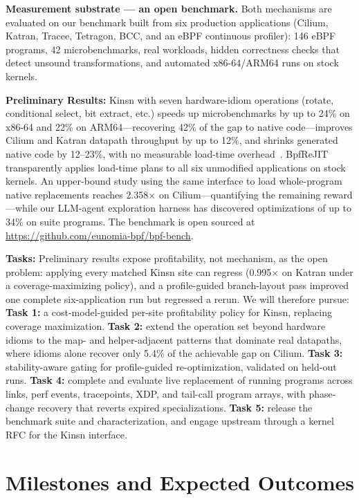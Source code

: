 \noindent\textbf{Measurement substrate --- an open benchmark.}  Both mechanisms are evaluated on our benchmark built from six production applications (Cilium, Katran, Tracee, Tetragon, BCC, and an eBPF continuous profiler): 146 eBPF programs, 42 microbenchmarks, real workloads, hidden correctness checks that detect unsound transformations, and automated x86-64/ARM64 runs on stock kernels.

\noindent\textbf{Preliminary Results:} Kinsn with seven hardware-idiom operations (rotate, conditional select, bit extract, etc.) speeds up microbenchmarks by up to 24\% on x86-64 and 22\% on ARM64---recovering 42\% of the gap to native code---improves Cilium and Katran datapath throughput by up to 12\%, and shrinks generated native code by 12--23\%, with no measurable load-time overhead~\cite{zheng2026kinsn}.  BpfReJIT transparently applies load-time plans to all six unmodified applications on stock kernels.  An upper-bound study using the same interface to load whole-program native replacements reaches 2.358$\times$ on Cilium---quantifying the remaining reward---while our LLM-agent exploration harness has discovered optimizations of up to 34\% on suite programs.  The benchmark is open sourced at \url{https://github.com/eunomia-bpf/bpf-bench}.

\noindent\textbf{Tasks:} Preliminary results expose profitability, not mechanism, as the open problem: applying every matched Kinsn site can regress (0.995$\times$ on Katran under a coverage-maximizing policy), and a profile-guided branch-layout pass improved one complete six-application run but regressed a rerun.  We will therefore pursue: \textbf{Task 1:} a cost-model-guided per-site profitability policy for Kinsn, replacing coverage maximization.  \textbf{Task 2:} extend the operation set beyond hardware idioms to the map- and helper-adjacent patterns that dominate real datapaths, where idioms alone recover only 5.4\% of the achievable gap on Cilium.  \textbf{Task 3:} stability-aware gating for profile-guided re-optimization, validated on held-out runs.  \textbf{Task 4:} complete and evaluate live replacement of running programs across links, perf events, tracepoints, XDP, and tail-call program arrays, with phase-change recovery that reverts expired specializations.  \textbf{Task 5:} release the benchmark suite and characterization, and engage upstream through a kernel RFC for the Kinsn interface.

\section{Milestones and Expected Outcomes}

